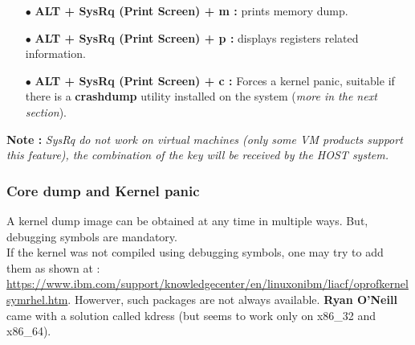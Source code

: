 \begin{itemize}
\begin{itemize}
		
		\item[$\bullet$] \textbf{ALT + SysRq (Print Screen) + m :} prints memory dump.
		\item[$\bullet$] \textbf{ALT + SysRq (Print Screen) + p :} displays registers related information.
		\item[$\bullet$] \textbf{ALT + SysRq (Print Screen) + c :} Forces a kernel panic, suitable if there is a \textbf{crashdump} utility installed on the system (\emph{more in the next section}).
	\end{itemize}
\end{itemize}



\textbf{\color{orange}Note :} \emph{\color{red}SysRq do not work on virtual machines (only some VM products support this feature), the combination of the key will be received by the HOST system.}

\subsubsection{Core dump and Kernel panic}
A kernel dump image can be obtained at any time in multiple ways. But, debugging symbols are mandatory.\\
If the kernel was not compiled using debugging symbols, one may try to add them as shown at : {\color{blue}\url{https://www.ibm.com/support/knowledgecenter/en/linuxonibm/liacf/oprofkernelsymrhel.htm}}. Howerver, such packages are not always available. \textbf{Ryan O'Neill} came with a solution called kdress (but seems to work only on x86\_32 and x86\_64).


